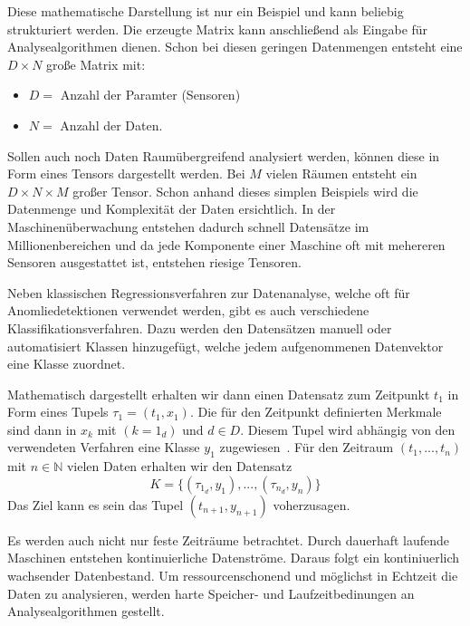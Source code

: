 Diese mathematische Darstellung ist nur ein Beispiel und kann beliebig strukturiert werden.
Die erzeugte Matrix kann anschließend als Eingabe für Analysealgorithmen dienen.
Schon bei diesen geringen Datenmengen entsteht eine $D \times N $ große Matrix mit: 
\begin{itemize}
  \item $D=$ Anzahl der Paramter (Sensoren)
  \item $N=$ Anzahl der Daten.
\end{itemize}

Sollen auch noch Daten Raumübergreifend analysiert werden, können diese in Form eines Tensors dargestellt werden. Bei $M$ vielen Räumen entsteht ein $D \times N \times M$ großer Tensor.
Schon anhand dieses simplen Beispiels wird die Datenmenge und Komplexität der Daten ersichtlich.
In der Maschinenüberwachung entstehen dadurch schnell Datensätze im Millionenbereichen und da jede Komponente einer Maschine oft mit mehereren Sensoren ausgestattet ist, entstehen riesige Tensoren.

Neben klassischen Regressionsverfahren zur Datenanalyse, welche oft für Anomliedetektionen verwendet werden, gibt es auch verschiedene Klassifikationsverfahren. Dazu werden den Datensätzen manuell oder automatisiert Klassen hinzugefügt, welche jedem aufgenommenen Datenvektor eine Klasse zuordnet.

Mathematisch dargestellt erhalten wir dann einen Datensatz zum Zeitpunkt $t_1$ in Form eines Tupels $\tau_1=(t_1,x_1)$. Die für den Zeitpunkt definierten Merkmale sind dann in $x_k$ mit $(k=1_d)$ und $d \in D$. Diesem Tupel wird abhängig von den verwendeten Verfahren eine Klasse $y_1$ zugewiesen~\cite{gay2013feature}. Für den Zeitraum $(t_1,...,t_n)$ mit $n \in \mathbb{N}$ vielen Daten erhalten wir den Datensatz 
\begin{equation}
  K=\{ (\tau_{1_d},y_{1}), ... , (\tau_{n_d},y_n) \}
  \label{equ:trainingset}
\end{equation}
Das Ziel kann es sein das Tupel $(t_{n+1},y_{n+1})$ voherzusagen.

Es werden auch nicht nur feste Zeiträume betrachtet. 
Durch dauerhaft laufende Maschinen entstehen kontinuierliche Datenströme.
Daraus folgt ein kontiniuerlich wachsender Datenbestand.
Um ressourcenschonend und möglichst in Echtzeit die Daten zu analysieren, werden harte Speicher- und Laufzeitbedinungen an Analysealgorithmen gestellt.


